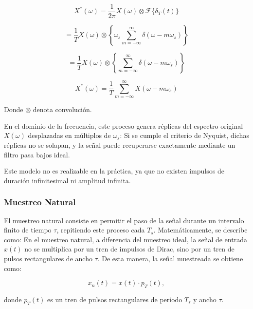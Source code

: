 \begin{equation}
    X^*(\omega) = \frac{1}{2\pi} X(\omega) \otimes \mathcal{F}\{\delta_T(t)\}
\end{equation}

\begin{equation}
    = \frac{1}{T} X(\omega) \otimes \left\{ \omega_s \sum_{m=-\infty}^{\infty} \delta(\omega - m\omega_s) \right\}
\end{equation}

\begin{equation}
    = \frac{1}{T} X(\omega) \otimes \left\{ \sum_{m=-\infty}^{\infty} \delta(\omega - m\omega_s) \right\}
\end{equation}

\begin{equation}
    X^*(\omega) = \frac{1}{T} \sum_{m=-\infty}^{\infty} X(\omega - m\omega_s)
\end{equation}


Donde $\otimes$ denota convolución. 


En el dominio de la frecuencia, este proceso genera réplicas del espectro original $X(\omega)$ desplazadas en múltiplos de $\omega_s$:
Si se cumple el criterio de Nyquist, dichas réplicas no se solapan, y la señal puede recuperarse
exactamente mediante un filtro pasa bajos ideal. 

\bigskip

Este modelo no es realizable en la práctica, ya que no existen impulsos de duración infinitesimal ni amplitud infinita.

\subsubsection{Muestreo Natural}
El muestreo natural consiste en permitir el paso de la señal durante un intervalo finito de tiempo $\tau$, repitiendo este proceso cada $T_s$. Matemáticamente, se describe como:
En el muestreo natural, a diferencia del muestreo ideal, la señal de entrada $x(t)$ no se multiplica 
por un tren de impulsos de Dirac, sino por un tren de pulsos rectangulares de ancho $\tau$. 
De esta manera, la señal muestreada se obtiene como:

\begin{equation}
    x_n(t) = x(t) \cdot p_T(t),
\end{equation}

donde $p_T(t)$ es un tren de pulsos rectangulares de período $T_s$ y ancho $\tau$.

\bigskip

